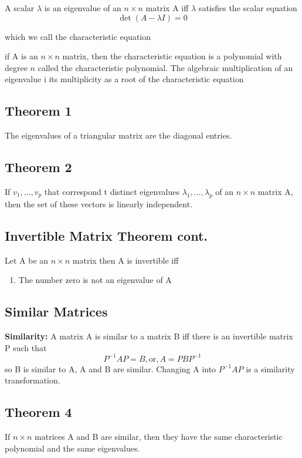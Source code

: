 A scalar $\lambda$ is an eigenvalue of an $n \times n$ matrix A iff $\lambda$ satisfies the scalar equation
\begin{equation}
	\label{}
\det(A-\lambda I)=0	
\end{equation}

which we call the characteristic equation

if A is an $n \times n$ matrix, then the characteristic equation is a polynomial with degree $n$ called the characteristic polynomial. The algebraic multiplication of an eigenvalue i its multiplicity as a root of the characteristic equation

\subsection{Theorem 1}
The eigenvalues of a triangular matrix are the diagonal entries.

\subsection{Theorem 2}
If $v_{1},\ldots,v_{p}$ that correspond t distinct eigenvalues $\lambda_{1},\ldots,\lambda_{p}$ of an $n\times n$ matrix A, then the set of these vectors is linearly independent.

\subsection{Invertible Matrix Theorem cont.}
Let A be an $n\times n$ matrix then A is invertible iff 

\begin{enumerate}
	\item The number zero is not an eigenvalue of A
\end{enumerate}


\subsection{Similar Matrices}

\textbf{Similarity:}
A matrix A is similar to a matrix B iff there is an invertible matrix P such that
\begin{equation}
	P^{-1}AP=B,\mbox{or},A=PBP^{-1}	
\end{equation}
so B is similar to A, A and B are similar. Changing A into $P^{-1}AP$ is a similarity transformation.

\subsection{Theorem 4}
If $n\times n$ matrices A and B are similar, then they have the same characteristic polynomial and the same eigenvalues.\


